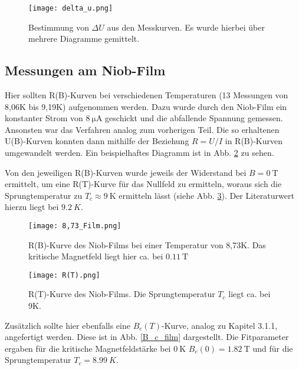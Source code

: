 \begin{figure}[H]
	\begin{center}
		\texttt{[image: delta\_u.png]}
		\caption{Bestimmung von $\Delta U$ aus den Messkurven. Es wurde hierbei über mehrere Diagramme gemittelt.}
		\label{delta_u}
	\end{center}
\end{figure}

\subsection{Messungen am Niob-Film}

Hier sollten R(B)-Kurven bei verschiedenen Temperaturen (13 Messungen von 8,06K bis 9,19K) aufgenommen werden. Dazu wurde durch den Niob-Film ein konstanter Strom von $\SI{8}{\micro\ampere}$ geschickt und die abfallende Spannung gemessen. Ansonsten war das Verfahren analog zum vorherigen Teil. Die so erhaltenen U(B)-Kurven konnten dann mithilfe der Beziehung $R=U/I$ in R(B)-Kurven umgewandelt werden. Ein beispielhaftes Diagramm ist in Abb. \ref{8,73_film} zu sehen.

Von den jeweiligen R(B)-Kurven wurde jeweils der Widerstand bei $B=\SI{0}{\tesla}$ ermittelt, um eine R(T)-Kurve für das Nullfeld zu ermitteln, woraus sich die Sprungtemperatur zu $T_{c}\approx\SI{9}{\kelvin}$ ermitteln lässt (siehe Abb. \ref{R(T)}). Der Literaturwert hierzu liegt bei $\SI{9,2}{K}$.

 \begin{figure}[H]
 	\begin{center}
 		\texttt{[image: 8,73\_Film.png]}
 		\caption{R(B)-Kurve des Niob-Films bei einer Temperatur von 8,73K. Das kritische Magnetfeld liegt hier ca. bei $\SI{0,11}{\tesla}$}
 		\label{8,73_film}
 	\end{center}
 \end{figure}

\begin{figure}[H]
	\begin{center}
		\texttt{[image: R(T).png]}
		\caption{R(T)-Kurve des Niob-Films. Die Sprungtemperatur $T_{c}$ liegt ca. bei 9K.}
		\label{R(T)}
	\end{center}
\end{figure}

Zusätzlich sollte hier ebenfalls eine $B_{c}(T)$-Kurve, analog zu Kapitel 3.1.1,  angefertigt werden. Diese ist in Abb. \ref{B_c_film} dargestellt. Die Fitparameter ergaben für die kritische Magnetfeldstärke bei $\SI{0}{\kelvin}$ $B_{c}(0)=\SI{1,82}{\tesla}$ und für die Sprungtemperatur $T_{c}=\SI{8,99}{K}$.

